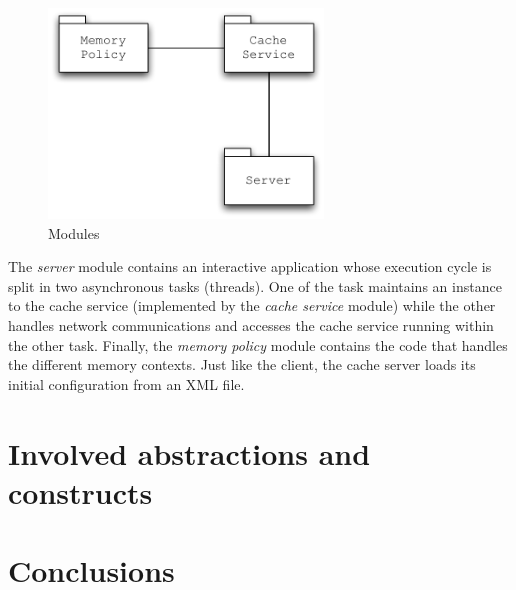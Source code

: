 \documentclass[11pt,a4paper]{article}
\begin{document}
\begin{figure}
\begin{center}
\includegraphics[width=0.65\textwidth]{figures/Server-Modules.pdf}
\caption{Modules}
\label{figure:server-modules}
\end{center}
\end{figure}

The \textit{server} module contains an interactive application whose execution cycle is split in two asynchronous tasks (threads). One of the task maintains an instance to the cache service (implemented by the \textit{cache service} module) while the other handles network communications and accesses the cache service running within the other task. Finally, the \textit{memory policy} module contains the code that handles the different memory contexts. Just like the client, the cache server loads its initial configuration from an XML file.

\section{Involved abstractions and constructs}
\label{section:functionalities}

\section{Conclusions}
\label{section:conclusions}
\end{document}
